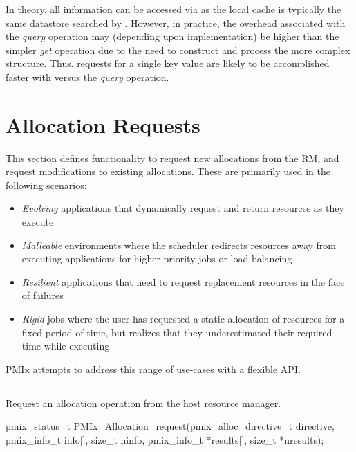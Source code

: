 In theory, all information can be accessed via  as the local cache is typically the same datastore searched by . However, in practice, the overhead associated with the \emph{query} operation may (depending upon implementation) be higher than the simpler \emph{get} operation due to the need to construct and process the more complex  structure. Thus, requests for a single key value are likely to be accomplished faster with  versus the \emph{query} operation.


\section{Allocation Requests}
\label{chap:api_job_mgmt:alloc}

This section defines functionality to request new allocations from the \ac{RM}, and request modifications to existing allocations.
These are primarily used in the following scenarios:
\begin{itemize}
\item \textit{Evolving} applications that dynamically request and return resources as they execute
\item \textit{Malleable} environments where the scheduler redirects resources away from executing applications for higher priority jobs or load balancing
\item \textit{Resilient} applications that need to request replacement resources in the face of failures
\item \textit{Rigid} jobs where the user has requested a static allocation of resources for a fixed period of time, but realizes that they underestimated their required time while executing
\end{itemize}
\ac{PMIx} attempts to address this range of use-cases with a flexible \ac{API}.

\subsection{}

\summary

Request an allocation operation from the host resource manager.

\format

\cspecificstart
\begin{codepar}
pmix_status_t
PMIx_Allocation_request(pmix_alloc_directive_t directive,
                        pmix_info_t info[], size_t ninfo,
                        pmix_info_t *results[], size_t *nresults);
\end{codepar}
\cspecificend

